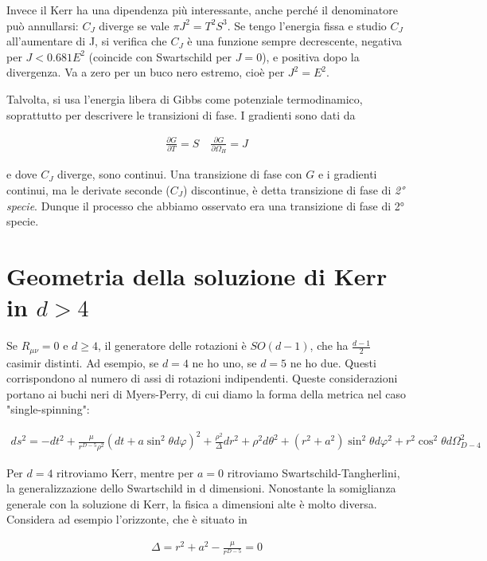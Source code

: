 \documentclass{report}
\begin{document}
Invece il Kerr ha una dipendenza più interessante, anche perché il denominatore può annullarsi: \(C_J\) diverge se vale \(\pi J^2 = T^2S^3\). Se tengo l'energia fissa e studio \(C_J\) all'aumentare di J, si verifica che \(C_J\) è una funzione sempre decrescente, negativa per \(J < 0.681 E^2\) (coincide con Swartschild per \(J=0\)), e positiva dopo la divergenza. Va a zero per un buco nero estremo, cioè per \(J^2 = E^2\). 

Talvolta, si usa l'energia libera di Gibbs come potenziale termodinamico, soprattutto per descrivere le transizioni di fase. I gradienti sono dati da 

\begin{align}
    \frac{\partial G}{\partial T} = S \quad \frac{\partial G}{\partial \Omega_H} = J 
\end{align}

e dove \(C_J\) diverge, sono continui. Una transizione di fase con \(G\) e i gradienti continui, ma le derivate seconde (\(C_J\)) discontinue, è detta transizione di fase di \emph{2° specie}. Dunque il processo che abbiamo osservato era una transizione di fase di 2° specie. 

\section{Geometria della soluzione di Kerr in \(d > 4\)}

Se \(R_{\mu\nu} = 0\) e \(d \geq 4\), il generatore delle rotazioni è \(SO(d-1)\), che ha \(\frac{d-1}{2}\) casimir distinti. Ad esempio, se \(d=4\) ne ho uno, se \(d=5\) ne ho due. Questi corrispondono al numero di assi di rotazioni indipendenti. Queste considerazioni portano ai buchi neri di Myers-Perry, di cui diamo la forma della metrica nel caso "single-spinning": 

\begin{align}
    ds^2 = -dt^2 + \frac{\mu}{r^{D-5}\rho^2}(dt+a\sin^2\theta d\varphi)^2 + \frac{\rho^2}{\Delta}dr^2 + \rho^2d\theta^2 + (r^2 + a^2)\sin^2\theta d\varphi^2 + r^2\cos^2\theta d\Omega^2_{D-4}
\end{align}

Per \(d=4\) ritroviamo Kerr, mentre per \(a =0\) ritroviamo Swartschild-Tangherlini, la generalizzazione dello Swartschild in d dimensioni. Nonostante la somiglianza generale con la soluzione di Kerr, la fisica a dimensioni alte è molto diversa. Considera ad esempio l'orizzonte, che è situato in 

\begin{align}
    \Delta = r^2 + a^2 - \frac{\mu}{r^{D-5}} = 0 
\end{align}
\end{document}
